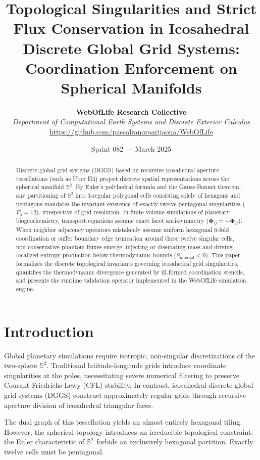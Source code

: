 \documentclass[10pt,twocolumn,letterpaper]{article}
\title{\textbf{Topological Singularities and Strict Flux Conservation in Icosahedral Discrete Global Grid Systems: Coordination Enforcement on Spherical Manifolds}}
\author{
  \textbf{WebOfLife Research Collective} \\
  \textit{Department of Computational Earth Systems and Discrete Exterior Calculus} \\
  \url{https://github.com/pascalranoroarijaona/WebOfLife}
}
\date{Sprint 082 --- March 2025}
\theoremstyle{definition}
\begin{document}
\maketitle

\begin{abstract}
Discrete global grid systems (DGGS) based on recursive icosahedral aperture tessellations (such as Uber H3) project discrete spatial representations across the spherical manifold $\mathbb{S}^2$. By Euler's polyhedral formula and the Gauss-Bonnet theorem, any partitioning of $\mathbb{S}^2$ into 3-regular polygonal cells consisting solely of hexagons and pentagons mandates the invariant existence of exactly twelve pentagonal singularities ($F_5 = 12$), irrespective of grid resolution. In finite volume simulations of planetary biogeochemistry, transport equations assume exact facet anti-symmetry ($\mathbf{\Phi}_{ij} = -\mathbf{\Phi}_{ji}$). When neighbor adjacency operators mistakenly assume uniform hexagonal 6-fold coordination or suffer boundary edge truncation around these twelve singular cells, non-conservative phantom fluxes emerge, injecting or dissipating mass and driving localized entropy production below thermodynamic bounds ($\dot{S}_{\mathrm{internal}} < 0$). This paper formalizes the discrete topological invariants governing icosahedral grid singularities, quantifies the thermodynamic divergence generated by ill-formed coordination stencils, and presents the runtime validation operator implemented in the WebOfLife simulation engine.
\end{abstract}

\section{Introduction}
Global planetary simulations require isotropic, non-singular discretizations of the two-sphere $\mathbb{S}^2$. Traditional latitude-longitude grids introduce coordinate singularities at the poles, necessitating severe numerical filtering to preserve Courant-Friedrichs-Lewy (CFL) stability. In contrast, icosahedral discrete global grid systems (DGGS) construct approximately regular grids through recursive aperture division of icosahedral triangular faces.

The dual graph of this tessellation yields an almost entirely hexagonal tiling. However, the spherical topology introduces an irreducible topological constraint: the Euler characteristic of $\mathbb{S}^2$ forbids an exclusively hexagonal partition. Exactly twelve cells must be pentagonal.
\end{document}

